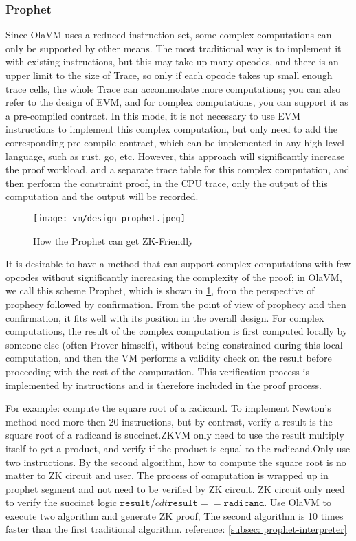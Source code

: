 \subsubsection{Prophet} \label{sec:design-prophet}

Since OlaVM uses a reduced instruction set, some complex computations can only be supported by other means. The most
traditional way is to implement it with existing instructions, but this may take up many opcodes, and there is an upper
limit to the size of Trace, so only if each opcode takes up small enough trace cells, the whole Trace can accommodate more
computations; you can also refer to the design of EVM, and for complex computations, you can support it as a pre-compiled
contract. In this mode, it is not necessary to use EVM instructions to implement this complex computation, but only need
to add the corresponding pre-compile contract, which can be implemented in any high-level language, such as rust, go, etc.
However, this approach will significantly increase the proof workload, and a separate trace table for this complex computation,
and then perform the constraint proof, in the CPU trace, only the output of this computation and the output will be recorded.

\begin{figure}[!ht]
    \centering
    \texttt{[image: vm/design-prophet.jpeg]}
    \caption{How the Prophet can get ZK-Friendly}
    \label{fig:design-prophet}
\end{figure}

It is desirable to have a method that can support complex computations with few opcodes without significantly increasing the
complexity of the proof; in OlaVM, we call this scheme Prophet, which is shown in \ref{fig:design-prophet}, from the perspective
of prophecy followed by confirmation. From the point of view of prophecy and then confirmation, it fits well with its position
in the overall design. For complex computations, the result of the complex computation is first computed locally by someone else
(often Prover himself), without being constrained during this local computation, and then the VM performs a validity check on the
result before proceeding with the rest of the computation. This verification process is implemented by instructions and is therefore
included in the proof process.

For example: compute the square root of a radicand. To implement Newton's method need more then 20 instructions, but by contrast, 
verify a result is the square root of a radicand is succinct.ZKVM only need to use the result multiply itself to get a product, 
and verify if the product is equal to the radicand.Only use two instructions. By the second algorithm, how to compute the square 
root is no matter to ZK circuit and user. The process of computation is wrapped up in prophet segment and not need to be verified 
by ZK circuit. ZK circuit only need to verify the succinct logic $\texttt{result} /cdt \texttt{result} == \texttt{radicand}$.
Use OlaVM to execute two algorithm and generate ZK proof, The second algorithm is 10 times faster than the first traditional algorithm.
reference: \ref{subsec: prophet-interpreter}

